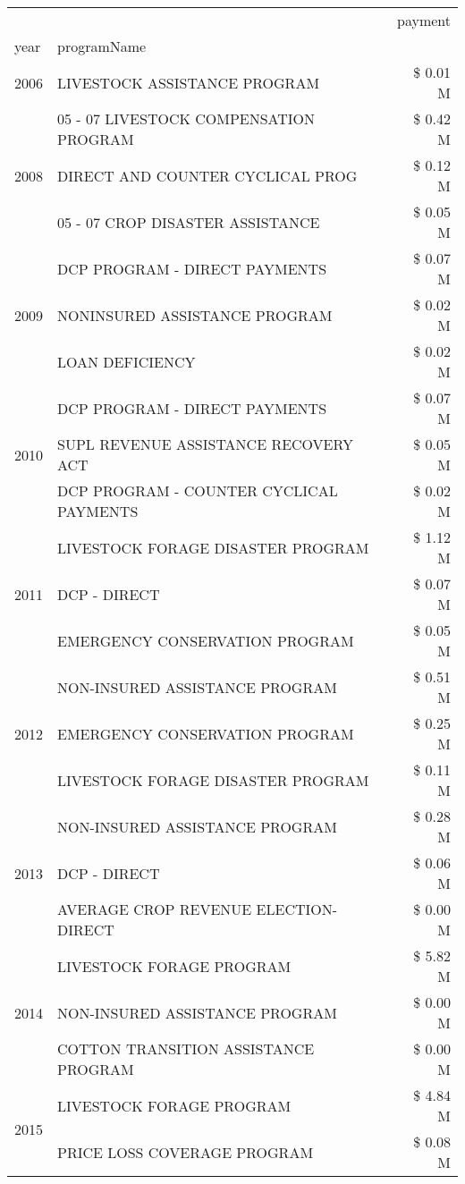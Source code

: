 \begin{tabular}{llr}
\toprule
 &  & payment \\
year & programName &  \\
\midrule
2006 & LIVESTOCK ASSISTANCE PROGRAM & \$ 0.01 M \\
\cline{1-3}
\multirow[t]{3}{*}{2008} & 05 - 07 LIVESTOCK COMPENSATION PROGRAM & \$ 0.42 M \\
 & DIRECT AND COUNTER CYCLICAL PROG & \$ 0.12 M \\
 & 05 - 07 CROP DISASTER ASSISTANCE & \$ 0.05 M \\
\cline{1-3}
\multirow[t]{3}{*}{2009} & DCP PROGRAM - DIRECT PAYMENTS & \$ 0.07 M \\
 & NONINSURED ASSISTANCE PROGRAM & \$ 0.02 M \\
 & LOAN DEFICIENCY & \$ 0.02 M \\
\cline{1-3}
\multirow[t]{3}{*}{2010} & DCP PROGRAM - DIRECT PAYMENTS & \$ 0.07 M \\
 & SUPL REVENUE ASSISTANCE RECOVERY ACT & \$ 0.05 M \\
 & DCP PROGRAM - COUNTER CYCLICAL PAYMENTS & \$ 0.02 M \\
\cline{1-3}
\multirow[t]{3}{*}{2011} & LIVESTOCK FORAGE DISASTER PROGRAM & \$ 1.12 M \\
 & DCP - DIRECT & \$ 0.07 M \\
 & EMERGENCY CONSERVATION PROGRAM & \$ 0.05 M \\
\cline{1-3}
\multirow[t]{3}{*}{2012} & NON-INSURED ASSISTANCE PROGRAM & \$ 0.51 M \\
 & EMERGENCY CONSERVATION PROGRAM & \$ 0.25 M \\
 & LIVESTOCK FORAGE DISASTER PROGRAM & \$ 0.11 M \\
\cline{1-3}
\multirow[t]{3}{*}{2013} & NON-INSURED ASSISTANCE PROGRAM & \$ 0.28 M \\
 & DCP - DIRECT & \$ 0.06 M \\
 & AVERAGE CROP REVENUE ELECTION-DIRECT & \$ 0.00 M \\
\cline{1-3}
\multirow[t]{3}{*}{2014} & LIVESTOCK FORAGE PROGRAM & \$ 5.82 M \\
 & NON-INSURED ASSISTANCE PROGRAM & \$ 0.00 M \\
 & COTTON TRANSITION ASSISTANCE PROGRAM & \$ 0.00 M \\
\cline{1-3}
\multirow[t]{3}{*}{2015} & LIVESTOCK FORAGE PROGRAM & \$ 4.84 M \\
 & PRICE LOSS COVERAGE PROGRAM & \$ 0.08 M \\

\end{tabular}
